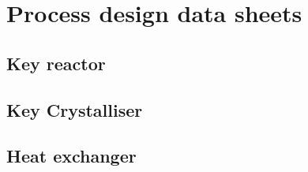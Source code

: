 \section{Process design data sheets}

\subsection{Key reactor}

\subsection{Key Crystalliser}

\subsection{Heat exchanger}

\subsection{}

\subsection{}

\subsection{}

\subsection{}

\subsection{}

\subsection{}

\subsection{}

\subsection{}
